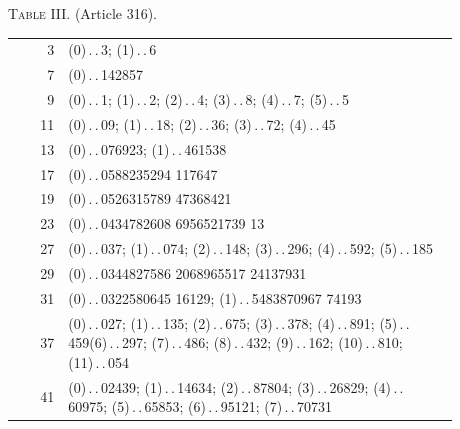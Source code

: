

\begin{center}\textsc{Table III.} (Article 316).\end{center}
\begingroup\small\setlength{\tabcolsep}{5pt}\renewcommand{\arraystretch}{1.0}\setlength{\LTpre}{0pt}
\begin{longtable}{r||>{\raggedright\arraybackslash}p{0.88\linewidth}}\hline
3 & \mbox{(0)\,.\,.\,}\mbox{3}; \mbox{(1)\,.\,.\,}\mbox{6}\\
7 & \mbox{(0)\,.\,.\,}\mbox{142857}\\
9 & \mbox{(0)\,.\,.\,}\mbox{1}; \mbox{(1)\,.\,.\,}\mbox{2}; \mbox{(2)\,.\,.\,}\mbox{4}; \mbox{(3)\,.\,.\,}\mbox{8}; \mbox{(4)\,.\,.\,}\mbox{7}; \mbox{(5)\,.\,.\,}\mbox{5}\\
11 & \mbox{(0)\,.\,.\,}\mbox{09}; \mbox{(1)\,.\,.\,}\mbox{18}; \mbox{(2)\,.\,.\,}\mbox{36}; \mbox{(3)\,.\,.\,}\mbox{72}; \mbox{(4)\,.\,.\,}\mbox{45}\\
13 & \mbox{(0)\,.\,.\,}\mbox{076923}; \mbox{(1)\,.\,.\,}\mbox{461538}\\
17 & \mbox{(0)\,.\,.\,}\mbox{0588235294} \mbox{117647}\\
19 & \mbox{(0)\,.\,.\,}\mbox{0526315789} \mbox{47368421}\\
23 & \mbox{(0)\,.\,.\,}\mbox{0434782608} \mbox{6956521739} \mbox{13}\\
27 & \mbox{(0)\,.\,.\,}\mbox{037}; \mbox{(1)\,.\,.\,}\mbox{074}; \mbox{(2)\,.\,.\,}\mbox{148}; \mbox{(3)\,.\,.\,}\mbox{296}; \mbox{(4)\,.\,.\,}\mbox{592}; \mbox{(5)\,.\,.\,}\mbox{185}\\
29 & \mbox{(0)\,.\,.\,}\mbox{0344827586} \mbox{2068965517} \mbox{24137931}\\
31 & \mbox{(0)\,.\,.\,}\mbox{0322580645} \mbox{16129}; \mbox{(1)\,.\,.\,}\mbox{5483870967} \mbox{74193}\\
37 & \mbox{(0)\,.\,.\,}\mbox{027}; \mbox{(1)\,.\,.\,}\mbox{135}; \mbox{(2)\,.\,.\,}\mbox{675}; \mbox{(3)\,.\,.\,}\mbox{378}; \mbox{(4)\,.\,.\,}\mbox{891}; \mbox{(5)\,.\,.\,}\mbox{459}\newline \mbox{(6)\,.\,.\,}\mbox{297}; \mbox{(7)\,.\,.\,}\mbox{486}; \mbox{(8)\,.\,.\,}\mbox{432}; \mbox{(9)\,.\,.\,}\mbox{162}; \mbox{(10)\,.\,.\,}\mbox{810}; \mbox{(11)\,.\,.\,}\mbox{054}\\
41 & \mbox{(0)\,.\,.\,}\mbox{02439}; \mbox{(1)\,.\,.\,}\mbox{14634}; \mbox{(2)\,.\,.\,}\mbox{87804}; \mbox{(3)\,.\,.\,}\mbox{26829}; \mbox{(4)\,.\,.\,}\mbox{60975}; \mbox{(5)\,.\,.\,}\mbox{65853}; \mbox{(6)\,.\,.\,}\mbox{95121}; \mbox{(7)\,.\,.\,}\mbox{70731}\\

\end{longtable}
